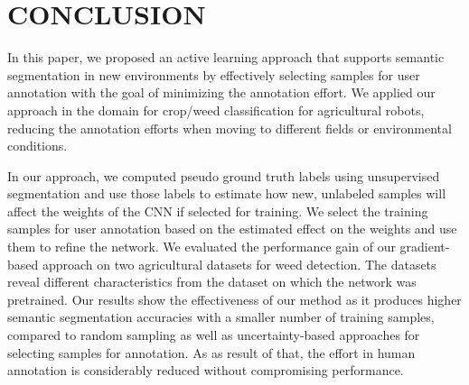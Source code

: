 \documentclass[letterpaper, 10 pt, conference]{ieeeconf}  %
\begin{document}
\addtolength{\textheight}{-0.4cm}   %




\section{CONCLUSION}
\label{sec:conclusion}

In this paper, we proposed an active learning approach that supports semantic
segmentation in new environments by effectively selecting samples for user
annotation with the goal of minimizing the annotation effort. We applied our
approach in the domain for crop/weed classification for agricultural robots,
reducing the annotation efforts when moving to different fields or environmental
conditions.

In our approach, we computed pseudo ground truth labels using unsupervised 
segmentation and use those labels to estimate how new, unlabeled samples will 
affect the weights of the CNN if selected for training. We select the training
samples for user annotation based on the estimated effect on the weights and use them to refine the 
network. We evaluated  the performance gain of our gradient-based 
approach on two agricultural  datasets for weed detection. The datasets 
reveal different characteristics from the dataset on which the network was pretrained.
Our results show the effectiveness of our method as it produces higher semantic segmentation
accuracies with a smaller number of training samples, compared to random sampling as
well as uncertainty-based approaches for selecting samples for annotation. As as result
of that, the effort in human annotation is considerably reduced without compromising
performance.
 




\end{document}
